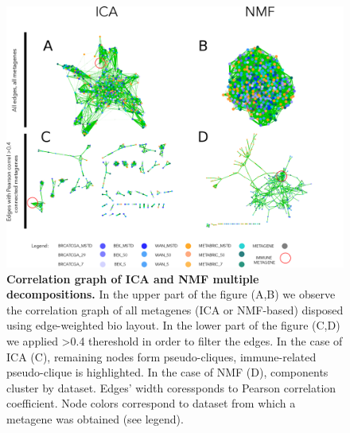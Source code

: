 \documentclass[12pt,]{book}
\theoremstyle{definition}
\theoremstyle{definition}
\theoremstyle{definition}
\theoremstyle{remark}
\begin{document}
\begin{figure}

{\centering \includegraphics[width=1\linewidth]{figures-ext/ICANMF} 

}

\caption{\textbf{Correlation graph of ICA and NMF multiple
decompositions.} In the upper part of the figure (A,B) we observe the
correlation graph of all metagenes (ICA or NMF-based) disposed using
edge-weighted bio layout. In the lower part of the figure (C,D) we
applied \textgreater{}0.4 thereshold in order to filter the edges. In
the case of ICA (C), remaining nodes form pseudo-cliques, immune-related
pseudo-clique is highlighted. In the case of NMF (D), components cluster
by dataset. Edges' width coressponds to Pearson correlation coefficient.
Node colors correspond to dataset from which a metagene was obtained
(see legend).}\label{fig:icavsnmf}
\end{figure}
\end{document}

